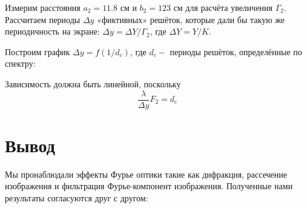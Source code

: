 \documentclass[a4paper, 12pt]{article}
\begin{document}
\begin{enumerate}
    Измерим расстояния $a_{2} = 11.8$ см и $b_{2} = 123$ см для расчёта увеличения $\Gamma_{2}$. Рассчитаем периоды $\Delta y$ «фиктивных» решёток, которые дали бы такую же периодичность на экране: $\Delta y=\Delta Y / \Gamma_{2}$, где $\Delta Y=Y / K .$

    Построим график $\Delta y=f\left(1 / d_{c}\right)$, где $d_{c}-$ периоды решёток, определённые по спектру:
        

    
    Зависимость должна быть линейной, поскольку
    $$
    \frac{\lambda}{\Delta y} F_{2}=d_{\mathrm{c}}
    $$
    
\end{enumerate}

\section{Вывод}

Мы пронаблюдали эффекты Фурье оптики такие как дифракция, рассечение изображения и фильтрация Фурье-компонент изображения.
Полученные нами результаты согласуются друг с другом:
\end{document}
